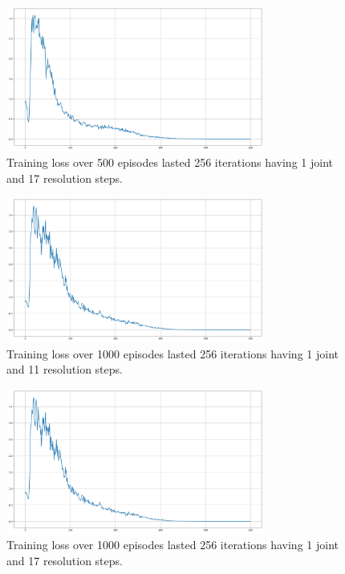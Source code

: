\documentclass[twocolumn, a4paper]{article}
\begin{document}
\label{fig:TrainLoss_1_500_17}
\begin{figure}[H]
	\centering
	\includegraphics[width=8.5cm]{"../Figures/training_loss_1J_500E_256EL_17RES.png"}
	\caption{Training loss over 500 episodes lasted 256 iterations having 1
			 joint and 17 resolution steps.}
\end{figure}
\vspace{-1cm}

\label{fig:TrainLoss_1_1000_11}
\begin{figure}[H]
	\centering
	\includegraphics[width=8.5cm]{"../Figures/training_loss_1J_500E_256EL_11RES.png"}
	\caption{Training loss over 1000 episodes lasted 256 iterations having 1
			 joint and 11 resolution steps.}
\end{figure}
\vspace{-1cm}

\label{fig:TrainLoss_1_1000_17}
\begin{figure}[H]
	\centering
	\includegraphics[width=8.5cm]{"../Figures/training_loss_1J_500E_256EL_11RES.png"}
	\caption{Training loss over 1000 episodes lasted 256 iterations having 1
			 joint and 17 resolution steps.}
\end{figure}
\vspace{-1cm}
\end{document}
